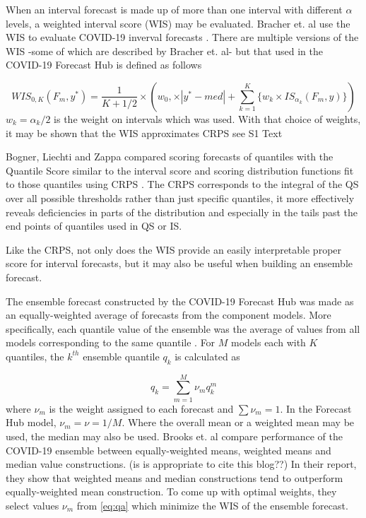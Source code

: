 \documentclass{article}\usepackage[]{graphicx}\usepackage[]{color}
\begin{document}
When an interval forecast is made up of more than one interval with different
$\alpha$ levels, a weighted interval score (WIS) may be evaluated. Bracher et.
al use the WIS to evaluate COVID-19 inverval forecasts 
\cite{bracher2021evaluating}.
There are multiple versions of the WIS -some of 
which are described by Bracher et. al- but that used in the COVID-19 Forecast
Hub is defined as follows

\begin{equation}
  WIS_{0,K}(F_m,y^*) = \frac{1}{K + 1/2} \times (w_0, \times |y^*-med|+
  \sum_{k=1}^K \{ w_k \times IS_{\alpha_k}(F_m,y) \} )
\end{equation}
$w_k = \alpha_k/2$ is the weight on
intervals which was used. With that choice of weights, it may be shown that the
WIS approximates CRPS see S1 Text  \cite{bracher2021evaluating}

Bogner, Liechti and Zappa compared scoring forecasts of quantiles with the 
Quantile Score similar to the interval score and scoring distribution functions
fit to those quantiles using CRPS \cite{bogner2017combining}. The CRPS 
corresponds to the integral of the QS over all possible thresholds rather than
just specific quantiles, it more effectively reveals deficiencies in parts of 
the distribution and especially in the tails past the end points of quantiles
used in QS or IS.

Like the CRPS, not only does the WIS provide an easily interpretable proper 
score for interval forecasts, but it may also be useful when building an 
ensemble forecast.

The ensemble forecast constructed by the COVID-19 Forecast Hub was made as an
equally-weighted average of forecasts from the component models. More 
specifically, each quantile value of the ensemble was the average of values from
all models corresponding to the same quantile \cite{ray2020ensemble}. For $M$ 
models each with $K$ quantiles, the $k^{th}$ ensemble quantile $q_k$ is 
calculated as

\begin{equation}
\label{eq:qa}
  q_k = \sum_{m=1}^M \nu_m q_k^m 
\end{equation}
where $\nu_m$ is the weight assigned to each forecast and $\sum \nu_m = 1$. In
the Forecast Hub model, $\nu_m = \nu = 1/M$. Where the overall mean or a
weighted mean may be used, the median may also be used.
Brooks et. al compare performance of the COVID-19 ensemble
between equally-weighted means, weighted means and median value constructions.
\cite{brooks2020comparing} (is is appropriate to cite this blog??)
In their report, they show that weighted means and median constructions tend
to outperform equally-weighted mean construction. To come up with optimal 
weights, they select values $\nu_m$ from \ref{eq:qa} which minimize the WIS of 
the ensemble forecast.
\end{document}
